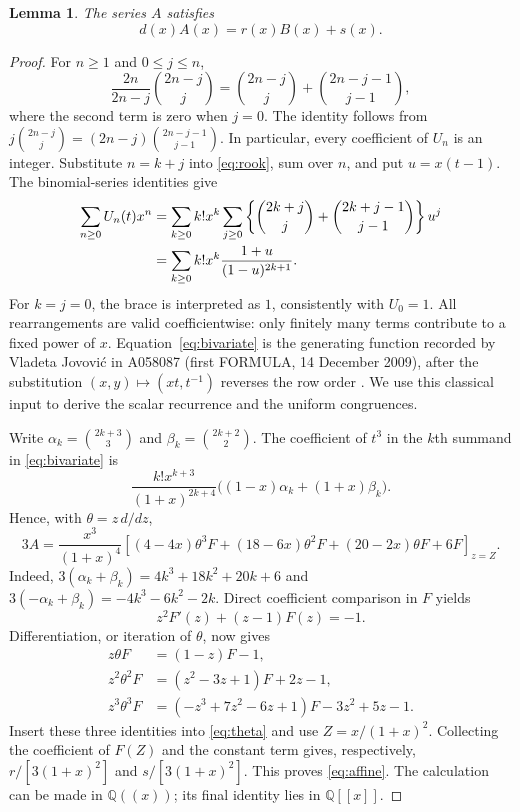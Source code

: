 \documentclass[11pt]{article}
\newtheorem{lemma}{Lemma}
\begin{document}
\begin{lemma}\label{lem:gf}
The series $A$ satisfies
\begin{equation}\label{eq:affine}
 d(x)A(x)=r(x)B(x)+s(x).
\end{equation}
\end{lemma}
\begin{proof}
For $n\geq1$ and $0\leq j\leq n$,
\[
 \frac{2n}{2n-j}\binom{2n-j}{j}
 =\binom{2n-j}{j}+\binom{2n-j-1}{j-1},
\]
where the second term is zero when $j=0$.
The identity follows from
$j\binom{2n-j}{j}=(2n-j)\binom{2n-j-1}{j-1}$.
In particular, every coefficient of $U_n$ is an integer.
Substitute $n=k+j$ into \eqref{eq:rook}, sum over $n$, and put
$u=x(t-1)$. The binomial-series identities give
\begin{align}
 \sum_{n\geq0}U_n(t)x^n
 &=\sum_{k\geq0}k!x^k
   \sum_{j\geq0}\left\{\binom{2k+j}{j}
           +\binom{2k+j-1}{j-1}\right\}u^j\notag\\
 &=\sum_{k\geq0}k!x^k\frac{1+u}{(1-u)^{2k+1}}.
 \label{eq:bivariate}
\end{align}
For $k=j=0$, the brace is interpreted as $1$, consistently with $U_0=1$.
All rearrangements are valid coefficientwise: only finitely many terms
contribute to a fixed power of $x$.
Equation~\eqref{eq:bivariate} is the generating function recorded by
Vladeta Jovovi\'c in A058087 (first FORMULA, 14 December 2009),
after the substitution $(x,y)\mapsto(xt,t^{-1})$ reverses the row order
\cite{a58087}. We use this classical input to derive the scalar
recurrence and the uniform congruences.

Write $\alpha_k=\binom{2k+3}{3}$ and $\beta_k=\binom{2k+2}{2}$.
The coefficient of $t^3$ in the $k$th summand in
\eqref{eq:bivariate} is
\[
 \frac{k!x^{k+3}}{(1+x)^{2k+4}}
       \bigl((1-x)\alpha_k+(1+x)\beta_k\bigr).
\]
Hence, with $\theta=z\,d/dz$,
\begin{equation}\label{eq:theta}
 3A=\frac{x^3}{(1+x)^4}
 \left[(4-4x)\theta^3F+(18-6x)\theta^2F
                  +(20-2x)\theta F+6F\right]_{z=Z}.
\end{equation}
Indeed,
$3(\alpha_k+\beta_k)=4k^3+18k^2+20k+6$ and
$3(-\alpha_k+\beta_k)=-4k^3-6k^2-2k$.
Direct coefficient comparison in $F$ yields
\[
 z^2F'(z)+(z-1)F(z)=-1.
\]
Differentiation, or iteration of $\theta$, now gives
\begin{align*}
 z\theta F&=(1-z)F-1,\\
 z^2\theta^2F&=(z^2-3z+1)F+2z-1,\\
 z^3\theta^3F&=(-z^3+7z^2-6z+1)F-3z^2+5z-1.
\end{align*}
Insert these three identities into \eqref{eq:theta} and use
$Z=x/(1+x)^2$. Collecting the coefficient of $F(Z)$ and the
constant term gives, respectively, $r/[3(1+x)^2]$ and
$s/[3(1+x)^2]$. This proves \eqref{eq:affine}.
The calculation can be made in $\mathbb Q((x))$; its final identity
lies in $\mathbb Q[[x]]$.
\end{proof}
\end{document}
